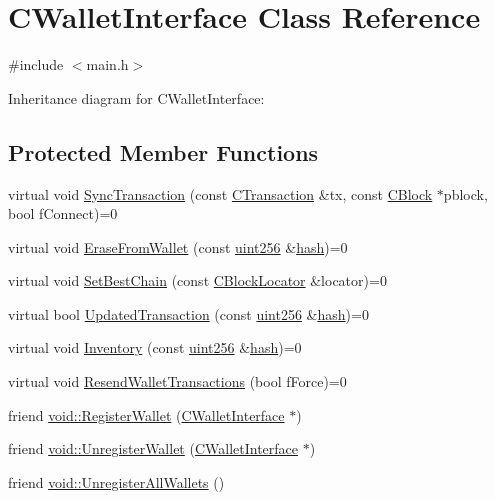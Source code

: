 \hypertarget{class_c_wallet_interface}{}\section{C\+Wallet\+Interface Class Reference}
\label{class_c_wallet_interface}


{\ttfamily \#include $<$main.\+h$>$}



Inheritance diagram for C\+Wallet\+Interface\+:
\subsection*{Protected Member Functions}
\begin{DoxyCompactItemize}
\item 
virtual void \hyperlink{class_c_wallet_interface_a7bde8e284f9405dd858c9b4cbf960ae5}{Sync\+Transaction} (const \hyperlink{class_c_transaction}{C\+Transaction} \&tx, const \hyperlink{class_c_block}{C\+Block} $\ast$pblock, bool f\+Connect)=0
\item 
virtual void \hyperlink{class_c_wallet_interface_a209e0de8725bab3274e7d79567cca630}{Erase\+From\+Wallet} (const \hyperlink{classuint256}{uint256} \&\hyperlink{cache_8cc_a11ecb029164e055f28f4123ce3748862}{hash})=0
\item 
virtual void \hyperlink{class_c_wallet_interface_ac9c87a58906081f6629f3f82439dad8e}{Set\+Best\+Chain} (const \hyperlink{class_c_block_locator}{C\+Block\+Locator} \&locator)=0
\item 
virtual bool \hyperlink{class_c_wallet_interface_a07b55d9aede02e25a5e8d8027c67954f}{Updated\+Transaction} (const \hyperlink{classuint256}{uint256} \&\hyperlink{cache_8cc_a11ecb029164e055f28f4123ce3748862}{hash})=0
\item 
virtual void \hyperlink{class_c_wallet_interface_a32858e2bb7bb6cb81ac391e0e2a0d4c1}{Inventory} (const \hyperlink{classuint256}{uint256} \&\hyperlink{cache_8cc_a11ecb029164e055f28f4123ce3748862}{hash})=0
\item 
virtual void \hyperlink{class_c_wallet_interface_acd71e9479057c2fdc433fc576e625edf}{Resend\+Wallet\+Transactions} (bool f\+Force)=0
\item 
friend \hyperlink{class_c_wallet_interface_a41e0e5970c0b64bcd32e7b32a6f5eb5a}{void\+::\+Register\+Wallet} (\hyperlink{class_c_wallet_interface}{C\+Wallet\+Interface} $\ast$)
\item 
friend \hyperlink{class_c_wallet_interface_aa2fc3f0cc9beaf7af22aebcb100496c6}{void\+::\+Unregister\+Wallet} (\hyperlink{class_c_wallet_interface}{C\+Wallet\+Interface} $\ast$)
\item 
friend \hyperlink{class_c_wallet_interface_a6d88a52257aa88c49ec9a82549003c3c}{void\+::\+Unregister\+All\+Wallets} ()
\end{DoxyCompactItemize}


